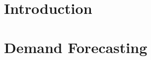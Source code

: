 
\chapter{Introduction}\label{ch:introduction}



\chapter{Demand Forecasting}\label{ch:demand_forecasting}
